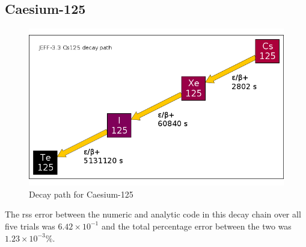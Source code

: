 \clearpage
\subsection{Caesium-125}

\FloatBarrier
\begin{figure}[!h]
\centering
		\includegraphics[width=.4\linewidth]{appendix/activity_equation/decay_paths/55cs125_decay.png}
		\caption{Decay path for Caesium-125 \cite{jeff311}}
		\label{fig:decaycs125}
\end{figure}
\FloatBarrier


The \acrshort{rss} error between the numeric and analytic code in this decay chain over all five trials was $6.42 \times 10^{-1}$ and the total percentage error between the two was $1.23 \times 10^{-3}\%$.

